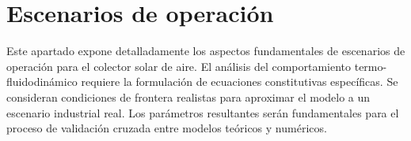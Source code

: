 \section{Escenarios de operación}
\label{sec:cap04_escenarios}

Este apartado expone detalladamente los aspectos fundamentales de escenarios de operación para el colector solar de aire.
El análisis del comportamiento termo-fluidodinámico requiere la formulación de ecuaciones constitutivas específicas.
Se consideran condiciones de frontera realistas para aproximar el modelo a un escenario industrial real.
Los parámetros resultantes serán fundamentales para el proceso de validación cruzada entre modelos teóricos y numéricos.
